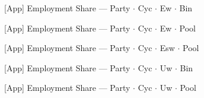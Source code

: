\documentclass[aspectratio=169,10pt]{beamer}
\newcommand{\tabledir}{../tables/firm}
\begin{document}
\begin{frame}[t,shrink=5]{[App] Employment Share --- Party $\cdot$ Cyc $\cdot$ Ew $\cdot$ Bin}
\begin{center}\footnotesize

\end{center}
\end{frame}

\begin{frame}[t,shrink=5]{[App] Employment Share --- Party $\cdot$ Cyc $\cdot$ Ew $\cdot$ Pool}
\begin{center}\footnotesize

\end{center}
\end{frame}

\begin{frame}[t,shrink=5]{[App] Employment Share --- Party $\cdot$ Cyc $\cdot$ Esw $\cdot$ Pool}
\begin{center}\footnotesize

\end{center}
\end{frame}

\begin{frame}[t,shrink=5]{[App] Employment Share --- Party $\cdot$ Cyc $\cdot$ Uw $\cdot$ Bin}
\begin{center}\footnotesize

\end{center}
\end{frame}

\begin{frame}[t,shrink=5]{[App] Employment Share --- Party $\cdot$ Cyc $\cdot$ Uw $\cdot$ Pool}
\begin{center}\footnotesize

\end{center}
\end{frame}
\end{document}
